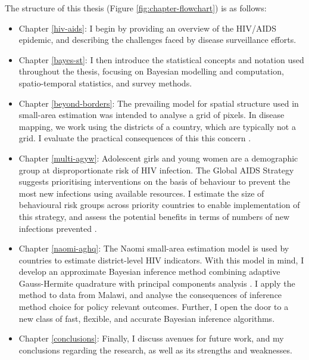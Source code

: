\documentclass[a4paper, nobind]{templates/ociamthesis}
\providecommand{\tightlist}{%
  \setlength{\itemsep}{0pt}\setlength{\parskip}{0pt}}
\begin{document}
The structure of this thesis (Figure \ref{fig:chapter-flowchart}) is as follows:

\begin{itemize}
\tightlist
\item
  Chapter \ref{hiv-aids}: I begin by providing an overview of the HIV/AIDS epidemic, and describing the challenges faced by disease surveillance efforts.
\item
  Chapter \ref{bayes-st}: I then introduce the statistical concepts and notation used throughout the thesis, focusing on Bayesian modelling and computation, spatio-temporal statistics, and survey methods.
\item
  Chapter \ref{beyond-borders}: The prevailing model for spatial structure used in small-area estimation \autocite{besag1991bayesian} was intended to analyse a grid of pixels.
  In disease mapping, we work using the districts of a country, which are typically not a grid.
  I evaluate the practical consequences of this this concern \autocite{howes2023beyond}.
\item
  Chapter \ref{multi-agyw}: Adolescent girls and young women are a demographic group at disproportionate risk of HIV infection.
  The Global AIDS Strategy suggests prioritising interventions on the basis of behaviour to prevent the most new infections using available resources.
  I estimate the size of behavioural risk groups across priority countries to enable implementation of this strategy, and assess the potential benefits in terms of numbers of new infections prevented \autocite{howes2023spatio}.
\item
  Chapter \ref{naomi-aghq}: The Naomi small-area estimation model \autocite{eaton2021naomi} is used by countries to estimate district-level HIV indicators.
  With this model in mind, I develop an approximate Bayesian inference method combining adaptive Gauss-Hermite quadrature with principal components analysis \autocite{howes2023fast}.
  I apply the method to data from Malawi, and analyse the consequences of inference method choice for policy relevant outcomes.
  Further, I open the door to a new class of fast, flexible, and accurate Bayesian inference algorithms.
\item
  Chapter \ref{conclusions}: Finally, I discuss avenues for future work, and my conclusions regarding the research, as well as its strengths and weaknesses.
\end{itemize}
\end{document}
